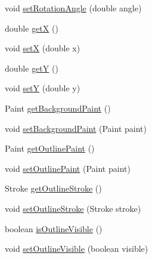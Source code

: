 \begin{DoxyCompactItemize}
\item 
void \mbox{\hyperlink{classorg_1_1jfree_1_1chart_1_1annotations_1_1_x_y_text_annotation_ae7a0ba2a95a356a1b81440986a37f321}{set\+Rotation\+Angle}} (double angle)
\item 
double \mbox{\hyperlink{classorg_1_1jfree_1_1chart_1_1annotations_1_1_x_y_text_annotation_a3d6dc594808c4088b31015658bd7c4f6}{getX}} ()
\item 
void \mbox{\hyperlink{classorg_1_1jfree_1_1chart_1_1annotations_1_1_x_y_text_annotation_afba0bd9c1debbeb1870ffaa2679cde08}{setX}} (double x)
\item 
double \mbox{\hyperlink{classorg_1_1jfree_1_1chart_1_1annotations_1_1_x_y_text_annotation_a8c0a7f769617443b23a36b7cdabc6860}{getY}} ()
\item 
void \mbox{\hyperlink{classorg_1_1jfree_1_1chart_1_1annotations_1_1_x_y_text_annotation_a3d9a4cc0c33eed1ac5e9e9ebd7022c8c}{setY}} (double y)
\item 
Paint \mbox{\hyperlink{classorg_1_1jfree_1_1chart_1_1annotations_1_1_x_y_text_annotation_a2b5d533237dd21f1fd5fe402c88efa80}{get\+Background\+Paint}} ()
\item 
void \mbox{\hyperlink{classorg_1_1jfree_1_1chart_1_1annotations_1_1_x_y_text_annotation_a541d1f0761326c21a156b6ecb5bad25f}{set\+Background\+Paint}} (Paint paint)
\item 
Paint \mbox{\hyperlink{classorg_1_1jfree_1_1chart_1_1annotations_1_1_x_y_text_annotation_a1ab87e5e927bca22a4439a37b353d4f1}{get\+Outline\+Paint}} ()
\item 
void \mbox{\hyperlink{classorg_1_1jfree_1_1chart_1_1annotations_1_1_x_y_text_annotation_a91879f03695e989564897cf72d219d22}{set\+Outline\+Paint}} (Paint paint)
\item 
Stroke \mbox{\hyperlink{classorg_1_1jfree_1_1chart_1_1annotations_1_1_x_y_text_annotation_a00d8dc7b42c84f629ffa430271a24e6b}{get\+Outline\+Stroke}} ()
\item 
void \mbox{\hyperlink{classorg_1_1jfree_1_1chart_1_1annotations_1_1_x_y_text_annotation_af3e01447131d46bad78ca98e9bcbf3b1}{set\+Outline\+Stroke}} (Stroke stroke)
\item 
boolean \mbox{\hyperlink{classorg_1_1jfree_1_1chart_1_1annotations_1_1_x_y_text_annotation_ae132320c259682dfea2b538ea711e441}{is\+Outline\+Visible}} ()
\item 
void \mbox{\hyperlink{classorg_1_1jfree_1_1chart_1_1annotations_1_1_x_y_text_annotation_accc3373043060089da1ffc3b6a334b7e}{set\+Outline\+Visible}} (boolean visible)
\item 

\end{DoxyCompactItemize}
